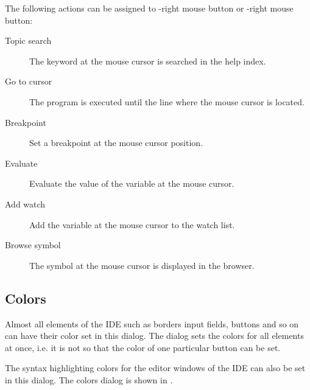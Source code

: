 The following actions can be assigned to -right mouse button or
-right mouse button:
\begin{description}
\item [Topic search] The keyword at the mouse cursor is searched in the
help index.
\item [Go to cursor] The program is executed until the line where
the mouse cursor is located.
\item [Breakpoint] Set a breakpoint at the mouse cursor position.
\item [Evaluate] Evaluate the value of the variable at the mouse
cursor.
\item [Add watch] Add the variable at the mouse cursor to the
watch list.
\item [Browse symbol] The symbol at the mouse cursor is displayed
in the browser.
\end{description}

%
%
\subsection{Colors}
\label{se:prefcolors}
Almost all elements of the IDE such as borders input fields, buttons and so
on can have their color set in this dialog. The dialog sets the colors for
all elements at once, i.e. it is not so that the color of one particular
button can be set.

The syntax highlighting colors for the editor windows of the IDE can also
be set in this dialog.
The colors dialog is shown in .


